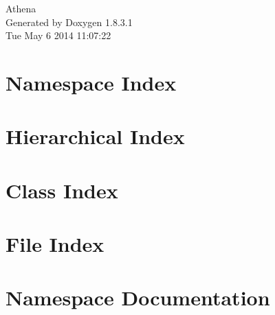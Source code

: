 \documentclass{book}
\begin{document}
\hypersetup{pageanchor=false,citecolor=blue}
\begin{titlepage}
\vspace*{7cm}
\begin{center}
{\Large Athena }\\
\vspace*{1cm}
{\large Generated by Doxygen 1.8.3.1}\\
\vspace*{0.5cm}
{\small Tue May 6 2014 11:07:22}\\
\end{center}
\end{titlepage}
\clearemptydoublepage
{}
\tableofcontents
\clearemptydoublepage
{}
\hypersetup{pageanchor=true,citecolor=blue}
\chapter{Namespace Index}

\chapter{Hierarchical Index}

\chapter{Class Index}

\chapter{File Index}

\chapter{Namespace Documentation}












\end{document}
